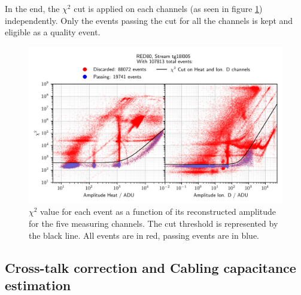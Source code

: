 In the end, the $\chi^2$ cut is applied on each channels (as seen in figure \ref{fig:chi2-cut}) independently. Only the events passing the cut for all the channels is kept and eligible as a quality event.

\begin{figure}
\centering
\includegraphics[width=\linewidth,]{Figures/ElectrodesExperimental/chi2_cut.png}
\caption{$\chi^2$ value for each event as a function of its reconstructed amplitude for the five measuring channels. The cut threshold is represented by the black line. All events are in red, passing events are in blue.}
\label{fig:chi2-cut}
\end{figure}


\subsection{Cross-talk correction and Cabling capacitance estimation}

